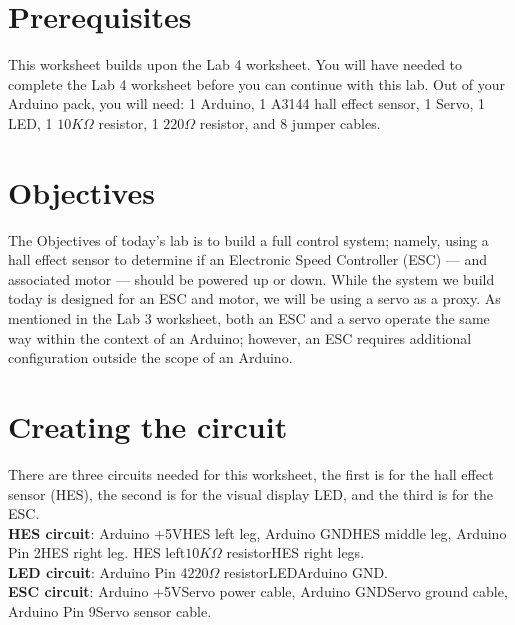 \documentclass[11pt,a4paper]{article}
\begin{document}
\pagestyle{fancy}

\section*{Prerequisites}
This worksheet builds upon the Lab 4 worksheet. You will have needed to complete the Lab 4 worksheet before you can continue with this lab. Out of your Arduino pack, you will need: 1 Arduino, 1 A3144 hall effect sensor, 1 Servo, 1 LED, 1 $10K\Omega$ resistor, 1 $220\Omega$ resistor, and 8 jumper cables.

\section*{Objectives}
The Objectives of today's lab is to build a full control system; namely, using a hall effect sensor to determine if an Electronic Speed Controller (ESC) --- and associated motor --- should be powered up or down. While the system we build today is designed for an ESC and motor, we will be using a servo as a proxy. As mentioned in the Lab 3 worksheet, both an ESC and a servo operate the same way within the context of an Arduino; however, an ESC requires additional configuration outside the scope of an Arduino.

\section{Creating the circuit}
\label{sec:circuit}
There are three circuits needed for this worksheet, the first is for the hall effect sensor (HES), the second is for the visual display LED, and the third is for the ESC.\\
\noindent
\textbf{HES circuit}: Arduino +5V\textrightarrow\hspace{0.1em}HES left leg, Arduino GND\textrightarrow\hspace{0.1em}HES middle leg, Arduino Pin 2\textrightarrow\hspace{0.1em}HES right leg. HES left\textrightarrow \hspace{0.1em}$10K\Omega$ resistor\textrightarrow\hspace{0.1em}HES right legs.\\
\noindent
\textbf{LED circuit}: Arduino Pin 4\textrightarrow $220\Omega$ resistor\textrightarrow LED\textrightarrow Arduino GND.\\
\noindent
\textbf{ESC circuit}: Arduino +5V\textrightarrow Servo power cable, Arduino GND\textrightarrow Servo ground cable, Arduino Pin 9\textrightarrow Servo sensor cable.
\end{document}

